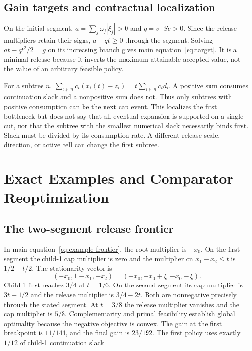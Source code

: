 \documentclass[11pt,letterpaper]{article}
\theoremstyle{definition}\newtheorem{remark}[theorem]{Remark}
\begin{document}
\subsection{Gain targets and contractual localization}
On the initial segment, $a=\sum_j\omega_j|\xi_j|>0$ and $q=v^\top Sv>0$. Since the release multipliers retain their signs, $a-qt\geq0$ through the segment. Solving $at-qt^2/2=g$ on its increasing branch gives main equation~\eqref{eq:target}. It is a minimal release because it inverts the maximum attainable accepted value, not the value of an arbitrary feasible policy.

For a subtree $n$, $\sum_{i\succeq n}c_i(x_i(t)-z_i)=t\sum_{i\succeq n}c_i d_i$. A positive sum consumes continuation slack and a nonpositive sum does not. Thus only subtrees with positive consumption can be the next cap event. This localizes the first bottleneck but does not say that all eventual expansion is supported on a single cut, nor that the subtree with the smallest numerical slack necessarily binds first. Slack must be divided by its consumption rate. A different release scale, direction, or active cell can change the first subtree.

\section{Exact Examples and Comparator Reoptimization}\label{ec:examples}
\subsection{The two-segment release frontier}
In main equation~\eqref{eq:example-frontier}, the root multiplier is $-x_0$. On the first segment the child-1 cap multiplier is zero and the multiplier on $x_1-x_2\leq t$ is $1/2-t/2$. The stationarity vector is
\[
 (-x_0,1-x_1,-x_2)=(-x_0,-x_0+\xi,-x_0-\xi).
\]
Child 1 first reaches $3/4$ at $t=1/6$. On the second segment its cap multiplier is $3t-1/2$ and the release multiplier is $3/4-2t$. Both are nonnegative precisely through the stated segment. At $t=3/8$ the release multiplier vanishes and the cap multiplier is $5/8$. Complementarity and primal feasibility establish global optimality because the negative objective is convex. The gain at the first breakpoint is $11/144$, and the final gain is $23/192$. The first policy uses exactly $1/12$ of child-1 continuation slack.
\end{document}
